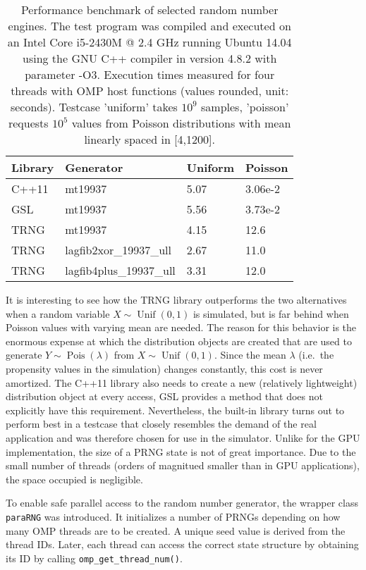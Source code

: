 \begin{enumerate}
\begin{table}[]
\centering
\begin{tabular}{|l|l|l|l|}
\hline
 \textbf{Library} & \textbf{Generator} & \textbf{Uniform} & \textbf{Poisson} \\ \hline
 C++11 & mt19937 & 5.07 & 3.06e-2 \\ \hline
 GSL & mt19937 & 5.56 & 3.73e-2 \\ \hline
 TRNG & mt19937 & 4.15 & 12.6 \\ \hline
 TRNG & lagfib2xor\_19937\_ull & 2.67 & 11.0 \\ \hline
 TRNG & lagfib4plus\_19937\_ull & 3.31 & 12.0 \\ \hline
\end{tabular}
\caption{Performance benchmark of selected random number engines. The test program
was compiled and executed on an Intel Core i5-2430M @ 2.4 GHz running Ubuntu 14.04 using the GNU C++ compiler in version 4.8.2 with parameter -O3. Execution times measured for four threads with OMP host functions (values rounded, unit: seconds). Testcase 'uniform' takes $10^9$ samples, 'poisson' requests $10^5$ values from Poisson distributions with mean linearly spaced in [4,1200].}
\label{tab:prng_perf}
\end{table}


It is interesting to see how the TRNG library outperforms the two alternatives when a random variable $X\sim\operatorname{Unif}(0,1)$ is simulated, but is far behind when Poisson values with varying mean are needed. The reason for this behavior is the enormous expense at which the distribution objects are created that are used to generate $Y\sim\operatorname{Pois}(\lambda)$ from $X\sim\operatorname{Unif}(0,1)$. Since the mean $\lambda$ (i.e.\ the propensity values in the simulation) changes constantly, this cost is never amortized. The C++11 library also needs to create a new (relatively lightweight) distribution object at every access, GSL provides a method that does not explicitly have this requirement. Nevertheless, the built-in library turns out to perform best in a testcase that closely resembles the demand of the real application and was therefore chosen for use in the simulator. Unlike for the GPU implementation, the size of a PRNG state is not of great importance. Due to the small number of threads (orders of magnitued smaller than in GPU applications), the space occupied is negligible. 

To enable safe parallel access to the random number generator, the wrapper class \texttt{paraRNG} was introduced. It initializes a number of PRNGs depending on how many OMP threads are to be created. A unique seed value is derived from the thread IDs. Later, each thread can access the correct state structure by obtaining its ID by calling \texttt{omp\_get\_thread\_num()}. 


\end{enumerate}
